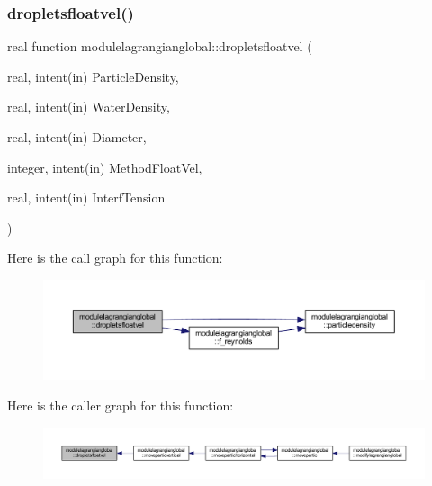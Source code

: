 \subsubsection{\texorpdfstring{dropletsfloatvel()}{dropletsfloatvel()}}
{\footnotesize\ttfamily real function modulelagrangianglobal\+::dropletsfloatvel (\begin{DoxyParamCaption}\item[{real, intent(in)}]{Particle\+Density,  }\item[{real, intent(in)}]{Water\+Density,  }\item[{real, intent(in)}]{Diameter,  }\item[{integer, intent(in)}]{Method\+Float\+Vel,  }\item[{real, intent(in)}]{Interf\+Tension }\end{DoxyParamCaption})\hspace{0.3cm}{\ttfamily [private]}}

Here is the call graph for this function\+:\nopagebreak
\begin{figure}[H]
\begin{center}
\leavevmode
\includegraphics[width=350pt]{namespacemodulelagrangianglobal_a2080e5fc3db1ae9253fe08012623e1bf_cgraph}
\end{center}
\end{figure}
Here is the caller graph for this function\+:\nopagebreak
\begin{figure}[H]
\begin{center}
\leavevmode
\includegraphics[width=350pt]{namespacemodulelagrangianglobal_a2080e5fc3db1ae9253fe08012623e1bf_icgraph}
\end{center}
\end{figure}
\mbox{\label{namespacemodulelagrangianglobal_aa302d13b1ed3a00c85939a4f07802591}} 
